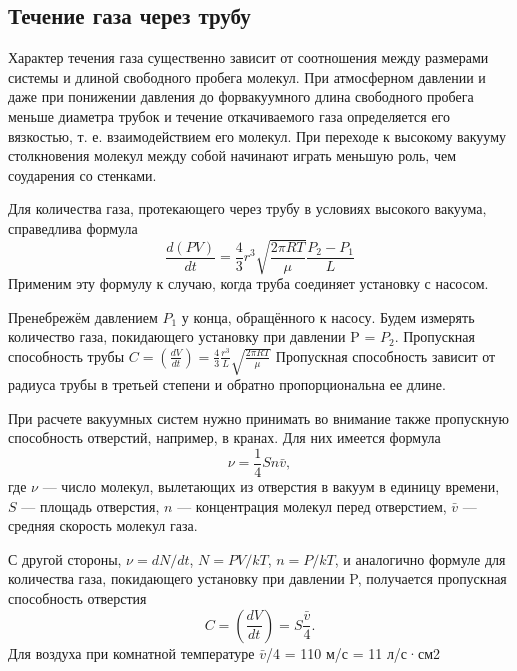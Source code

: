 \documentclass[12pt,a4paper]{article}
\begin{document}
\subsection{Течение газа через трубу}

Характер течения газа существенно зависит от соотношения между размерами системы и длиной свободного пробега молекул. При атмосферном давлении
и даже при понижении давления до форвакуумного длина свободного пробега меньше диаметра трубок и течение откачиваемого газа определяется его вязкостью, т. е. взаимодействием его молекул. При переходе к высокому
вакууму столкновения молекул между собой начинают играть меньшую роль, чем соударения со стенками. \par
Для количества газа, протекающего через трубу в условиях высокого вакуума, справедлива формула
\begin{equation}
\frac{d(PV)}{dt} = \frac{4}{3}r^3 \sqrt{\frac{2\pi RT}{\mu}}\frac{P_2-P_1}{L}
\label{eq:high_vacuum}
\end{equation}
\newpage
Применим эту формулу к случаю, когда труба соединяет установку с насосом. \par
Пренебрежём давлением $P_1$ у конца, обращённого к насосу. Будем измерять количество газа, покидающего установку при давлении P = $P_2$. Пропускная способность трубы
$C = (\frac{dV}{dt}) = \frac{4}{3}\frac{r^3}{L}\sqrt{\frac{2\pi RT}{\mu}}$
Пропускная способность зависит от радиуса трубы в
третьей степени и обратно пропорциональна ее длине. \par
При расчете вакуумных систем нужно принимать во внимание также пропускную способность отверстий, например, в кранах. Для них имеется формула
\begin{equation}
\nu = \frac{1}{4}Sn\bar v,
\end{equation}
где $\nu$ — число молекул, вылетающих из отверстия в вакуум в единицу
времени, $S$ — площадь отверстия, $n$ — концентрация молекул перед отверстием, $\bar v$ — средняя скорость молекул газа. \par
С другой стороны, $\nu = dN/dt$, $N = PV/kT$, $n=P/kT$, и аналогично формуле для количества газа, покидающего установку при давлении P, получается пропускная способность отверстия
\begin{equation}
C = \left(\frac{dV}{dt}\right)=S\frac{\bar v}{4}.
\label{eq:techenie}
\end{equation}
Для воздуха при комнатной температуре $\bar v$/4 = 110 м/с = 11 л/с·см2
\end{document}
